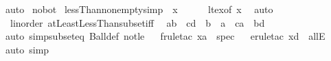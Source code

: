 \begin{isabellebody}
\ auto%
\endisatagproof
{\isafoldproof}%
%
\isadelimproof
\isanewline
%
\endisadelimproof
\isanewline
{}\isamarkupfalse%
\isanewline
\isanewline
{}\isamarkupfalse%
\ no{\isacharunderscore}{\kern0pt}bot\isanewline
{}\isanewline
\isanewline
{}\isamarkupfalse%
\ lessThan{\isacharunderscore}{\kern0pt}non{\isacharunderscore}{\kern0pt}empty{\isacharbrackleft}{\kern0pt}simp{\isacharbrackright}{\kern0pt}{\isacharcolon}{\kern0pt}\ {\isachardoublequoteopen}{\isacharbraceleft}{\kern0pt}{\isachardot}{\kern0pt}{\isachardot}{\kern0pt}{\isacharless}{\kern0pt}\ x{\isacharbraceright}{\kern0pt}\ {\isasymnoteq}\ {\isacharbraceleft}{\kern0pt}{\isacharbraceright}{\kern0pt}{\isachardoublequoteclose}\isanewline
%
\isadelimproof
\ \ %
\endisadelimproof
%
\isatagproof
{}\isamarkupfalse%
\ lt{\isacharunderscore}{\kern0pt}ex{\isacharbrackleft}{\kern0pt}of\ x{\isacharbrackright}{\kern0pt}\ \isamarkupfalse%
\ auto%
\endisatagproof
{\isafoldproof}%
%
\isadelimproof
\isanewline
%
\endisadelimproof
\isanewline
{}\isamarkupfalse%
\isanewline
\isanewline
{}\isamarkupfalse%
\ {\isacharparenleft}{\kern0pt}\ linorder{\isacharparenright}{\kern0pt}\ atLeastLessThan{\isacharunderscore}{\kern0pt}subset{\isacharunderscore}{\kern0pt}iff{\isacharcolon}{\kern0pt}\isanewline
\ \ {\isachardoublequoteopen}{\isacharbraceleft}{\kern0pt}a{\isachardot}{\kern0pt}{\isachardot}{\kern0pt}{\isacharless}{\kern0pt}b{\isacharbraceright}{\kern0pt}\ {\isasymsubseteq}\ {\isacharbraceleft}{\kern0pt}c{\isachardot}{\kern0pt}{\isachardot}{\kern0pt}{\isacharless}{\kern0pt}d{\isacharbraceright}{\kern0pt}\ {\isasymLongrightarrow}\ b\ {\isasymle}\ a\ {\isasymor}\ c{\isasymle}a\ {\isasymand}\ b{\isasymle}d{\isachardoublequoteclose}\isanewline
%
\isadelimproof
\ \ %
\endisadelimproof
%
\isatagproof
{}\isamarkupfalse%
\ {\isacharparenleft}{\kern0pt}auto\ simp{\isacharcolon}{\kern0pt}subset{\isacharunderscore}{\kern0pt}eq\ Ball{\isacharunderscore}{\kern0pt}def\ not{\isacharunderscore}{\kern0pt}le{\isacharparenright}{\kern0pt}\isanewline
\ \ \isamarkupfalse%
{\isacharparenleft}{\kern0pt}frule{\isacharunderscore}{\kern0pt}tac\ x{\isacharequal}{\kern0pt}a\ \ spec{\isacharparenright}{\kern0pt}\isanewline
\ \ \isamarkupfalse%
{\isacharparenleft}{\kern0pt}erule{\isacharunderscore}{\kern0pt}tac\ x{\isacharequal}{\kern0pt}d\ \ allE{\isacharparenright}{\kern0pt}\isanewline
\ \ \isamarkupfalse%
\ {\isacharparenleft}{\kern0pt}auto\ simp{\isacharcolon}{\kern0pt}\ {\isacharparenright}{\kern0pt}\isanewline

\end{isabellebody}

